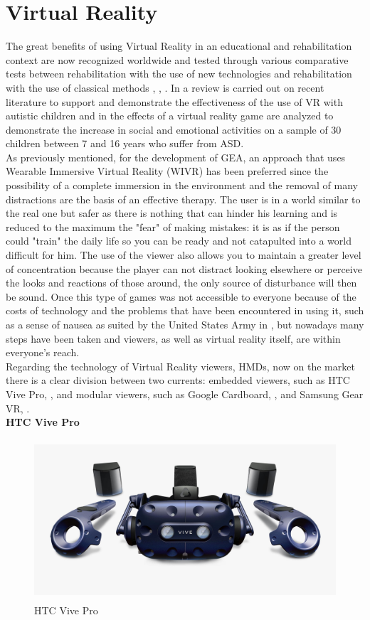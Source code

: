 \section{Virtual Reality}
The great benefits of using Virtual Reality in an educational and rehabilitation context are now recognized worldwide and tested through various comparative tests between rehabilitation with the use of new technologies and rehabilitation with the use of classical methods \cite{Parsons}, \cite{Reid}, \cite{Wii}. In \cite{Pelagia} a review is carried out on recent literature to support and demonstrate the effectiveness of the use of VR with autistic children and in \cite{Tandra} the effects of a virtual reality game are analyzed to demonstrate the increase in social and emotional activities on a sample of 30 children between 7 and 16 years who suffer from ASD.\\
As previously mentioned, for the development of GEA, an approach that uses Wearable Immersive Virtual Reality (WIVR) has been preferred since the possibility of a complete immersion in the environment and the removal of many distractions are the basis of an effective therapy. The user is in a world similar to the real one but safer as there is nothing that can hinder his learning and is reduced to the maximum the "fear" of making mistakes: it is as if the person could "train" the daily life so you can be ready and not catapulted into a world difficult for him. The use of the viewer also allows you to maintain a greater level of concentration because the player can not distract looking elsewhere or perceive the looks and reactions of those around, the only source of disturbance will then be sound. Once this type of games was not accessible to everyone because of the costs of technology and the problems that have been encountered in using it, such as a sense of nausea as suited by the United States Army in \cite{Eugenia}, but nowadays many steps have been taken and viewers, as well as virtual reality itself, are within everyone's reach.\\
Regarding the technology of Virtual Reality viewers, HMDs, now on the market there is a clear division between two currents: embedded viewers, such as HTC Vive Pro, \cite{Vive}, and modular viewers, such as Google Cardboard, \cite{Cardboard}, and Samsung Gear VR, \cite{Gear}.\\
\textbf{HTC Vive Pro}
\begin{figure}[H]
\centering
\includegraphics[width=12cm, height=6cm]{immagini/vive.jpg}
\caption{HTC Vive Pro}\label{fig:htcvive}
\end{figure}
